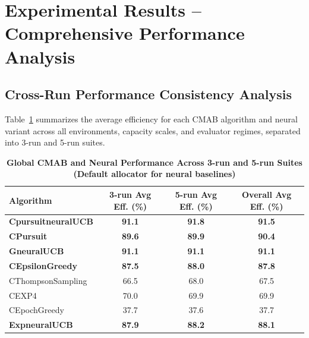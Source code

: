 \documentclass[12pt,a4paper]{article}
\newcommand{\performance}[1]{\textcolor{performancecolor}{\textbf{#1}}}
\newcommand{\neural}[1]{\textcolor{neuralcolor}{\textbf{#1}}}
\begin{document}
\section{Experimental Results – Comprehensive Performance Analysis}

\begin{tcolorbox}[colback=performancecolor!10,colframe=performancecolor,title=\textbf{Primary Performance Results (Aggregated Across Capacities, Environments, and Regimes)}]
\small
\subsection{Cross-Run Performance Consistency Analysis}

Table~\ref{tab:global-performance} summarizes the average efficiency for each CMAB algorithm and neural variant across all environments, capacity scales, and evaluator regimes, separated into 3-run and 5-run suites.

\begin{table}[H]
\small
\centering
\caption{\performance{Global CMAB and Neural Performance Across 3-run and 5-run Suites (Default allocator for neural baselines)}}
\label{tab:global-performance}
\begin{tabular}{|l|c|c|c|}
\hline
\textbf{Algorithm} & \textbf{3-run Avg Eff. (\%)} & \textbf{5-run Avg Eff. (\%)} & \textbf{Overall Avg Eff. (\%)} \\
\hline
\hline
\neural{CpursuitneuralUCB} & \neural{91.1} & \neural{91.8} & \neural{\textbf{91.5}} \\
\performance{CPursuit}                 & \performance{89.6} & \performance{89.9} & \performance{\textbf{90.4}} \\
\neural{GneuralUCB}        & \neural{91.1} & \neural{91.1} & \neural{\textbf{91.1}} \\
\performance{CEpsilonGreedy}          & \performance{87.5} & \performance{88.0} & \performance{\textbf{87.8}} \\
CThompsonSampling                     & 66.5              & 68.0              & 67.5 \\
CEXP4                                 & 70.0              & 69.9              & 69.9 \\
CEpochGreedy                          & 37.7              & 37.6              & 37.7 \\
\neural{ExpneuralUCB}      & \neural{87.9} & \neural{88.2} & \neural{\textbf{88.1}} \\
\hline
\end{tabular}
\end{table}


\end{tcolorbox}
\end{document}
